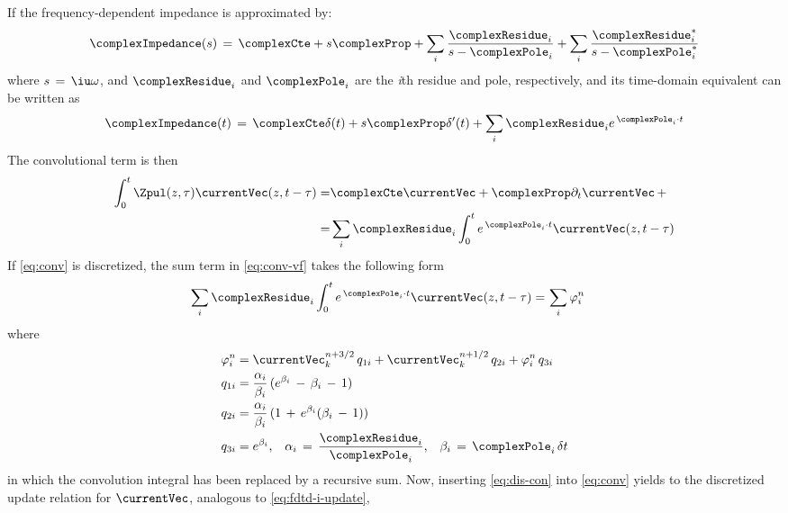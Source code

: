 If the frequency-dependent impedance is approximated by:
\begin{equation} \label{eq:Z-VF}
	\complexImpedance(s)\,=\,\complexCte + s\complexProp + \sum_{i} \frac{\complexResidue_i}{s-\complexPole_i} + \sum_{i} \frac{\complexResidue_i^{*}}{s-\complexPole_i^{*}}
\end{equation}
where $s\,=\,\iu\omega$, and $\complexResidue_i$ and $\complexPole_i$ are the \textit{i}th residue and pole, respectively, and its time-domain equivalent can be written as
\begin{equation} \label{eq:Z-VF-TD}
	\complexImpedance(t)\,=\,\complexCte\delta(t) + s\complexProp\delta^{\prime}(t) + \sum_{i} \complexResidue_i e^{\,\complexPole_i\cdot t}
\end{equation}
The convolutional term is then
\begin{align}
	\int_0^{t} \Zpul(z,\tau)  \currentVec(z,t-\tau) =& \complexCte \currentVec + \complexProp \partial_t \currentVec\,+ \nonumber \\ 
	=& \sum_{i} \complexResidue_i \int_0^{t} e^{\,\complexPole_i\cdot t} \currentVec(z,t-\tau) \label{eq:conv-vf}
\end{align}
If \autoref{eq:conv} is discretized, the sum term in \autoref{eq:conv-vf} takes the following form
\begin{align}
    \sum_i \complexResidue_i \int_0^{t} e^{\,\complexPole_i\cdot t} \currentVec(z,t-\tau) =& \, \sum_i  \varphi^{n}_{i}
    \label{eq:dis-con}
\end{align}
where 
\begin{align}
	\varphi^{n}_{i} &= \currentVec^{n+3/2}_{k}\,q_{1i} + \currentVec^{n+1/2}_{k}\,q_{2i} \nonumber  + \varphi^{n}_{i}\,q_{3i} \label{eq:conv-vf-2} \nonumber \\
	q_{1i} &= \frac{\alpha_i}{\beta_i}\,(e^{\beta_i}\,-\,\beta_i\,-\,1)\nonumber \\
	q_{2i} &= \frac{\alpha_i}{\beta_i}\,(1\,+\,e^{\beta_i}(\beta_i\,-\,1))\nonumber \\
	q_{3i} &= e^{\beta_{i}}\textrm{,} \hspace{10pt} \alpha_i\,=\,\frac{\complexResidue_i}{\complexPole_i}\textrm{,} \hspace{10pt} \beta_i\,=\,\complexPole_i\,\delta t\nonumber 
\end{align}
in which the convolution integral has been replaced by a recursive sum. 
Now, inserting \autoref{eq:dis-con} into \autoref{eq:conv} yields to the discretized update relation for $\currentVec$, analogous to \autoref{eq:fdtd-i-update},  
